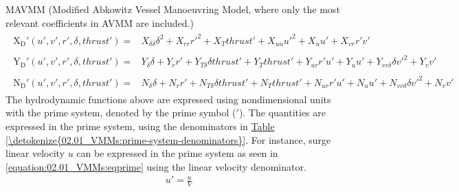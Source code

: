 \documentclass[review]{elsarticle}
\begin{document}
\sphinxAtStartPar
MAVMM (Modified Abkowitz Vessel Manoeuvring Model, where only the most relevant coefficients in AVMM are included.)
\begin{equation}\label{equation:02.01_VMMs:eqxmartinssimple}
\begin{split}\begin{split}
\operatorname{X_{D}'}{\left(u',v',r',\delta,thrust' \right)} = & X_{\delta\delta} \delta^{2} + X_{rr} r'^{2} + X_{T} thrust' + X_{uu} u'^{2} + X_{u} u' + X_{vr} r' v' 
\end{split}\end{split}
\end{equation}\begin{equation}\label{equation:02.01_VMMs:eqymartinssimple}
\begin{split}\begin{split}
\operatorname{Y_{D}'}{\left(u',v',r',\delta,thrust' \right)} = & Y_{\delta} \delta + Y_{r} r' + Y_{T\delta} \delta thrust' + Y_{T} thrust' + Y_{ur} r' u' + Y_{u} u' + Y_{vv\delta} \delta v'^{2} + Y_{v} v' 
\end{split}\end{split}
\end{equation}\begin{equation}\label{equation:02.01_VMMs:eqnmartinssimple}
\begin{split}\begin{split}
\operatorname{N_{D}'}{\left(u',v',r',\delta,thrust' \right)} = & N_{\delta} \delta + N_{r} r' + N_{T\delta} \delta thrust' + N_{T} thrust' + N_{ur} r' u' + N_{u} u' + N_{vv\delta} \delta v'^{2} + N_{v} v' 
\end{split}\end{split}
\end{equation}
\sphinxAtStartPar
The hydrodynamic functions above are expressed using nondimensional units with the prime system, denoted by the prime symbol (\('\)). The quantities are expressed in the prime system, using the denominators in \hyperref[\detokenize{02.01_VMMs:prime-system-denominators}]{Table \ref{\detokenize{02.01_VMMs:prime-system-denominators}}}. For instance, surge linear velocity \(u\) can be expressed in the prime system as seen in \autoref{equation:02.01_VMMs:eqprime} using the linear velocity denominator.
\begin{equation}\label{equation:02.01_VMMs:eqprime}
\begin{split}\displaystyle u'=\frac{u}{V}\end{split}
\end{equation}
\end{document}
